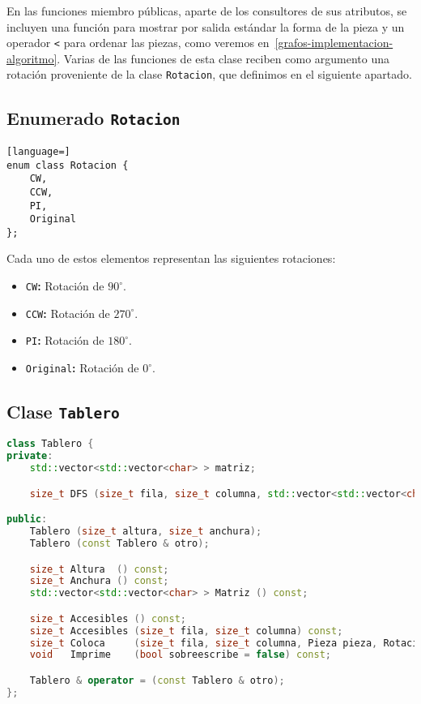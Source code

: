 En las funciones miembro públicas, aparte de los consultores de sus atributos, se incluyen una función para mostrar por salida estándar la forma de la pieza y un operador \texttt{<} para ordenar las piezas, como veremos en~\ref{grafos-implementacion-algoritmo}.
Varias de las funciones de esta clase reciben como argumento una rotación proveniente de la clase \texttt{Rotacion}, que definimos en el siguiente apartado.

\pagebreak

\subsection{Enumerado \texttt{Rotacion}}\label{grafos-implementacion-rotacion}

\begin{lstlisting}[language=]
enum class Rotacion {
	CW,
	CCW,
	PI,
	Original
};
\end{lstlisting}

Cada uno de estos elementos representan las siguientes rotaciones:

\begin{itemize}
	\item\texttt{CW}\textbf{:} Rotación de $90^{\circ}$.
	\item\texttt{CCW}\textbf{:} Rotación de $270^{\circ}$.
	\item\texttt{PI}\textbf{:} Rotación de $180^{\circ}$.
	\item\texttt{Original}\textbf{:} Rotación de $0^{\circ}$.
\end{itemize}

\subsection{Clase \texttt{Tablero}}\label{grafos-implementacion-tablero}

\begin{lstlisting}[language=C++]
class Tablero {
private:
	std::vector<std::vector<char> > matriz;

	size_t DFS (size_t fila, size_t columna, std::vector<std::vector<char> > & matriz) const;

public:
	Tablero (size_t altura, size_t anchura);
	Tablero (const Tablero & otro);

	size_t Altura  () const;
	size_t Anchura () const;
	std::vector<std::vector<char> > Matriz () const;

	size_t Accesibles () const;
	size_t Accesibles (size_t fila, size_t columna) const;
	size_t Coloca     (size_t fila, size_t columna, Pieza pieza, Rotacion rotacion = Rotacion::Original);
	void   Imprime    (bool sobreescribe = false) const;

	Tablero & operator = (const Tablero & otro);
};
\end{lstlisting}

